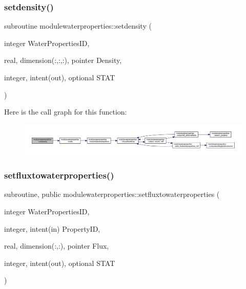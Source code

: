 \subsubsection{\texorpdfstring{setdensity()}{setdensity()}}
{\footnotesize\ttfamily subroutine modulewaterproperties\+::setdensity (\begin{DoxyParamCaption}\item[{integer}]{Water\+Properties\+ID,  }\item[{real, dimension(\+:,\+:,\+:), pointer}]{Density,  }\item[{integer, intent(out), optional}]{S\+T\+AT }\end{DoxyParamCaption})\hspace{0.3cm}{\ttfamily [private]}}

Here is the call graph for this function\+:\nopagebreak
\begin{figure}[H]
\begin{center}
\leavevmode
\includegraphics[width=350pt]{namespacemodulewaterproperties_a0e9ad0864f289819d005ffe929ac3f86_cgraph}
\end{center}
\end{figure}
\mbox{\label{namespacemodulewaterproperties_a5d755fdb3bd199311d38f1f88cbd7f10}} 
\subsubsection{\texorpdfstring{setfluxtowaterproperties()}{setfluxtowaterproperties()}}
{\footnotesize\ttfamily subroutine, public modulewaterproperties\+::setfluxtowaterproperties (\begin{DoxyParamCaption}\item[{integer}]{Water\+Properties\+ID,  }\item[{integer, intent(in)}]{Property\+ID,  }\item[{real, dimension(\+:,\+:), pointer}]{Flux,  }\item[{integer, intent(out), optional}]{S\+T\+AT }\end{DoxyParamCaption})}

